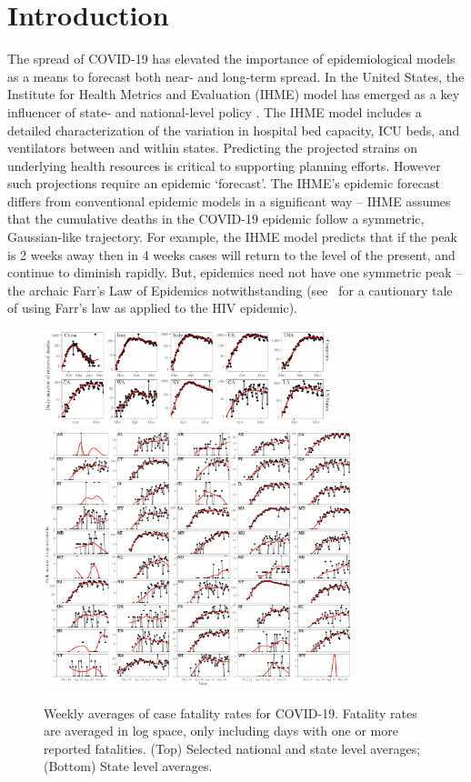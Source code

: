 \section{Introduction}
The spread of COVID-19 has elevated the importance of epidemiological
models as a means to forecast both near- and long-term spread. 
In the United States, the Institute for Health Metrics and Evaluation (IHME)
model has emerged as a key influencer of state- and national-level
policy \citep{covid2020forecasting}.  
The IHME model includes a detailed characterization
of the variation in
hospital bed capacity, ICU beds, and ventilators between and within
states. Predicting the projected strains on underlying
health resources is critical to supporting planning efforts.
However such projections require
an epidemic `forecast'.  The IHME's epidemic forecast
differs from conventional
epidemic models in a significant way -- IHME assumes
that the cumulative deaths in the COVID-19 epidemic 
follow a symmetric, Gaussian-like trajectory. 
For example, the 
IHME model predicts that if the peak is 2 weeks away then in 4 weeks
cases will return to the level of the present, and continue
to diminish rapidly.  But, epidemics need not have one symmetric peak -- 
the archaic Farr's Law of Epidemics notwithstanding
(see~\citep{bregman1990farr} for a cautionary tale of using
Farr's law as applied to the HIV epidemic). 
\begin{figure}[t!]
\begin{center}
\includegraphics[width=0.75\textwidth]{deaths/national_death.pdf}\\
\includegraphics[width=0.8\textwidth]{deaths/deaths.pdf}
\caption{Weekly averages of case fatality rates for COVID-19.
Fatality rates are averaged in log space, only including days with
one or more reported fatalities. (Top) Selected national
and state level averages; (Bottom) State level averages.
\label{fig.plateaus_cases}}
\end{center}
\end{figure}

